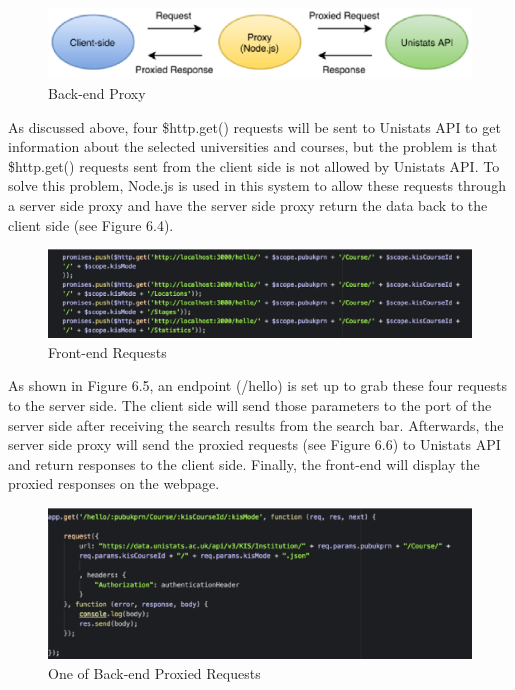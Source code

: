 \begin{figure}[H]
  \centering
  \includegraphics[width=12cm]{./img/Picture19}
  \caption{Back-end Proxy
}
  \label{Figure:figex}
\end{figure}

As discussed above, four \$http.get() requests will be sent to Unistats API to get information about the selected universities and courses, but the problem is that \$http.get() requests sent from the client side is not allowed by Unistats API. To solve this problem, Node.js is used in this system to allow these requests through a server side proxy and have the server side proxy return the data back to the client side (see Figure 6.4).

\begin{figure}[H]
  \centering
  \includegraphics[width=15cm]{./img/Picture20}
  \caption{Front-end Requests}
  \label{Figure:figex}
\end{figure}


As shown in Figure 6.5, an endpoint (/hello) is set up to grab these four requests to the server side. The client side will send those parameters to the port of the server side after receiving the search results from the search bar. Afterwards, the server side proxy will send the proxied requests (see Figure 6.6) to Unistats API and return responses to the client side. Finally, the front-end will display the proxied responses on the webpage. 

\begin{figure}[H]
  \centering
  \includegraphics[width=15cm]{./img/Picture21}
  \caption{One of Back-end Proxied Requests
}
  \label{Figure:figex}
\end{figure}



